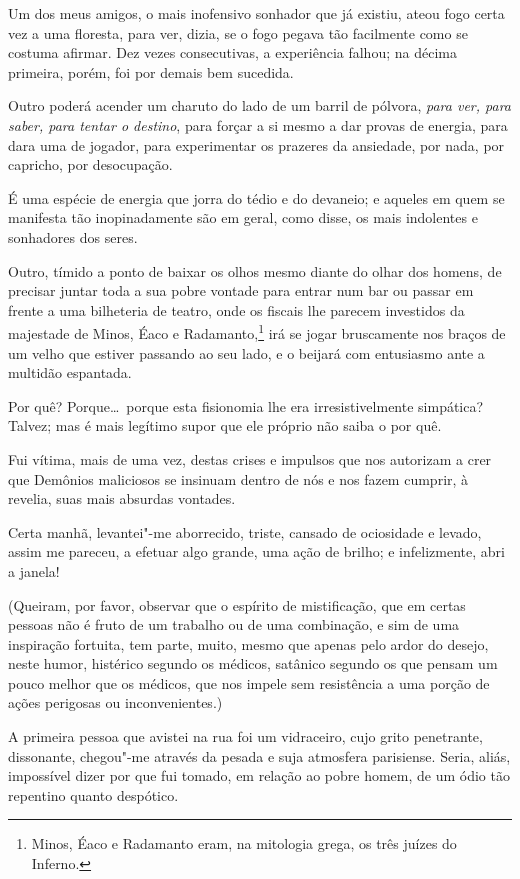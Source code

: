 Um dos meus amigos, o mais inofensivo sonhador que já existiu, ateou
fogo certa vez a uma floresta, para ver, dizia, se o fogo pegava tão facilmente como se costuma afirmar. Dez vezes consecutivas, a
experiência falhou; na décima primeira, porém, foi por demais bem
sucedida.

Outro poderá acender um charuto do lado de um barril de pólvora, \textit{para ver,
para saber, para tentar o destino}, para forçar a si mesmo a dar
provas de energia, para dara uma de jogador, para experimentar os prazeres da
ansiedade, por nada, por capricho, por desocupação. 

É uma espécie de energia que jorra do tédio e do devaneio; e aqueles em quem se manifesta tão inopinadamente são em geral, como 
disse, os mais indolentes e sonhadores dos seres.

Outro, tímido a ponto de baixar os olhos mesmo diante do olhar dos
homens, de precisar juntar toda a sua pobre vontade
para entrar num bar ou passar em frente a uma bilheteria de teatro, onde
os fiscais lhe parecem investidos da majestade de Minos, Éaco e
Radamanto,\protect\footnote{  Minos, Éaco e Radamanto eram, na mitologia grega, os três juízes do
Inferno.} irá se jogar bruscamente nos braços de um
velho que estiver passando ao seu lado, e o beijará com entusiasmo
ante a multidão espantada.

Por quê? Porque\ldots\  porque esta fisionomia lhe era irresistivelmente
simpática? Talvez; mas é mais legítimo supor que ele próprio não saiba o
por quê.

Fui vítima, mais de uma vez, destas crises e impulsos que nos
autorizam a crer que Demônios maliciosos se insinuam dentro de nós e
nos fazem cumprir, à revelia, suas mais absurdas vontades.

Certa manhã, levantei"-me aborrecido, triste, cansado de ociosidade e
levado, assim me pareceu, a efetuar algo grande, uma ação de brilho; e infelizmente, abri a
janela!

(Queiram, por favor, observar que o espírito de mistificação, que em
certas pessoas não é fruto de um trabalho ou de uma combinação, e sim 
de uma inspiração fortuita, tem parte, muito, mesmo que apenas pelo
ardor do desejo, neste humor, histérico segundo os médicos, satânico
segundo os que pensam um pouco melhor que os médicos, que nos
impele sem resistência a uma porção de ações perigosas ou
inconvenientes.)

A primeira pessoa que avistei na rua foi um vidraceiro, cujo grito
penetrante, dissonante, chegou"-me através da pesada e suja atmosfera
parisiense. Seria, aliás, impossível dizer por que fui tomado, em
relação ao pobre homem, de um ódio tão repentino quanto despótico.

